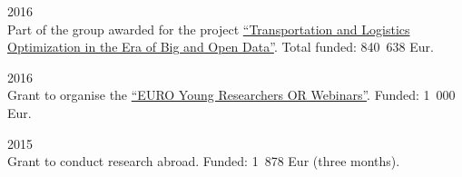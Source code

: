 \begin{paracol}{2}
  \textsc{2016}
\switchcolumn
  \\
  Part of the group awarded for the project \href{https://santini.in/files/cv/prin16.pdf}{``Transportation and Logistics Optimization in the Era of Big and Open Data''}.
  Total funded: 840~638 Eur.
\end{paracol}

\begin{paracol}{2}
  \textsc{2016}
\switchcolumn
  \\
  Grant to organise the \href{https://www.airoyoung.org/resources/euro-seminars}{``EURO Young Researchers OR Webinars''}.
  Funded: 1~000 Eur.
\end{paracol}

\begin{paracol}{2}
  \textsc{2015}
\switchcolumn
  \\
  Grant to conduct research abroad.
  Funded: 1~878 Eur (three months).
\end{paracol}